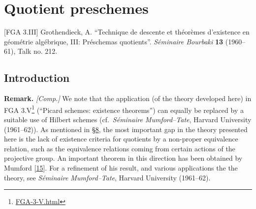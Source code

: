 \documentclass{article}
\renewcommand{\href}[2]{#2\footnote{\url{#1}}}
\newenvironment{rmenv}[1]
  {\phantomsection\par\smallskip\noindent\textbf{#1.}\rmfamily}
  {\par\smallskip}
\theoremstyle{definition}
\theoremstyle{definition}
\theoremstyle{definition}
\theoremstyle{definition}
\theoremstyle{remark}
\begin{document}
\hypertarget{fga-3.iii}{%
\section{Quotient preschemes}\label{fga-3.iii}}

\providecommand{\scr}[1]{{\mathscr{#1}}}
\renewcommand{\cal}[1]{{\mathcal{#1}}}
\renewcommand{\frak}[1]{{\mathfrak{#1}}}
\renewcommand{\geq}{\geqslant}
\renewcommand{\leq}{\leqslant}

\providecommand{\Set}{\mathtt{Set}}
\providecommand{\pr}{\mathrm{pr}}
\providecommand{\Gm}{\mathrm{G}_\mathrm{m}}
\providecommand{\id}{\operatorname{id}}
\providecommand{\Hom}{\operatorname{Hom}}
\providecommand{\Spec}{\operatorname{Spec}}
\providecommand{\Ker}{\operatorname{Ker}}
\providecommand{\GL}{\operatorname{GL}}
\providecommand{\sGL}{\operatorname{\mathscr{G}\!\!\mathscr{L}}}
\providecommand{\GP}{\operatorname{GP}}
\providecommand{\Aut}{\operatorname{Aut}}

{[}FGA 3.III{]}
Grothendieck, A.
``Technique de descente et théorèmes d'existence en géométrie algébrique, III: Préschemas quotients''.
\emph{Séminaire Bourbaki} \textbf{13} (1960--61), Talk no. 212.

\hypertarget{introduction}{%
\subsection*{Introduction}\label{introduction}}

\begin{rmenv}{Remark}
\emph{{[}Comp.{]}}
We note that the application (of the theory developed here) in \href{FGA-3-V.html}{FGA 3.V} (``Picard schemes: existence theorems'') can equally be replaced by a suitable use of Hilbert schemes (cf.~\emph{Séminaire Mumford--Tate}, Harvard University (1961--62)).
As mentioned in \protect\hyperlink{fga-3-iii-section-8}{§8}, the most important gap in the theory presented here is the lack of existence criteria for quotients by a non-proper equivalence relation, such as the equivalence relations coming from certain actions of the projective group.
An important theorem in this direction has been obtained by Mumford {[}\protect\hyperlink{ref-Mum1961}{15}{]}.
For a refinement of his result, and various applications the the theory, see \emph{Séminaire Mumford--Tate}, Harvard University (1961--62).

\end{rmenv}
\end{document}

